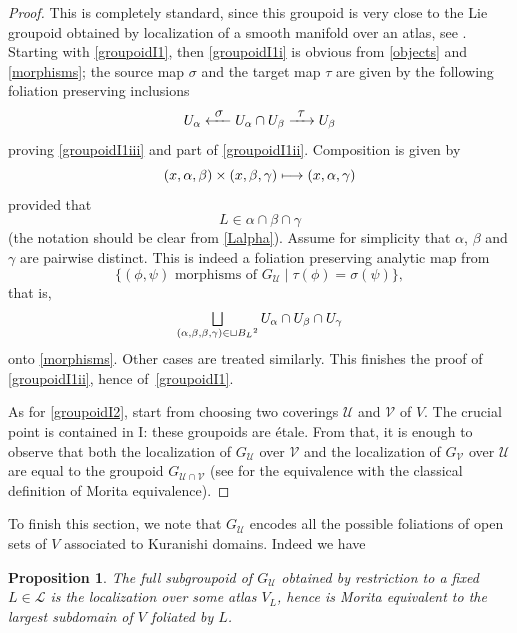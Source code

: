 \documentclass[JEP,XML,SOM,Unicode]{cedram}
\let\mathcal\mathscr
\let\oldbigsqcup\bigsqcup
\renewcommand{\bigsqcup}{\mathop{\textstyle\oldbigsqcup}\displaylimits}
\def\mto{\mathchoice{\longmapsto}{\mapsto}{\mapsto}{\mapsto}}
\def\To#1{\mathchoice{\xrightarrow{\textstyle\kern4pt#1\kern3pt}}{\stackrel{#1}{\longrightarrow}}{}{}}
\def\From#1{\mathchoice{\xleftarrow{\textstyle~#1~}}{\stackrel{#1}{\longleftarrow}}{}{}}
\theoremstyle{plain}
\newtheorem{proposition}[theorem]{Proposition}
\theoremstyle{definition}
\theoremstyle{remark}
\numberwithin{equation}{section}
\let\uniondisjointe\bigsqcup
\begin{document}
\begin{proof}
This is completely standard, since this groupoid is very close to the Lie groupoid obtained by localization of a smooth manifold over an atlas, see \cite[\S 7.1.3]{Ernesto}. Starting with \eqref{groupoidI1}, then \eqref{groupoidI1i} is obvious from \eqref{objects} and \eqref{morphisms}; the source map $\sigma$ and the target map $\tau$ are given by the following foliation preserving inclusions
\begin{equation}
\label{folinclusions}
U_{\alpha}\From{\sigma} U_{\alpha}\cap U_{\beta} \To{\tau}U_{\beta}
\end{equation}
proving \eqref{groupoidI1iii} and part of \eqref{groupoidI1ii}. Composition is given by
\begin{equation}
\label{composition}
(x,\alpha,\beta)\times (x,\beta,\gamma)\mto (x,\alpha,\gamma)
\end{equation}
provided that
\[
L\in\alpha\cap\beta\cap\gamma
\]
(the notation should be clear from \eqref{Lalpha}). Assume for simplicity that $\alpha$, $\beta$ and $\gamma$ are pairwise distinct.
This is indeed a foliation preserving analytic map from
\[
\{(\phi,\psi)\text{ morphisms of }G_{\mathcal U}\mid \tau (\phi)=\sigma (\psi)\},
\]
that is,
\begin{equation}
\label{compdomain}
\uniondisjointe_{(\alpha,\beta,\beta,\gamma)\in \sqcup {B_L}^2} U_{\alpha}\cap U_{\beta}\cap U_{\gamma}
\end{equation}
onto \eqref{morphisms}. Other cases are treated similarly. This finishes the proof of \eqref{groupoidI1ii}, hence of~\eqref{groupoidI1}.

As for \eqref{groupoidI2}, start from choosing two coverings $\mathcal U$ and $\mathcal V$ of $V$.
The crucial point is contained in I: these groupoids are étale. From that, it is enough to observe that both the localization of $G_{\mathcal U}$ over $\mathcal V$ and the localization of $G_{\mathcal V}$ over $\mathcal U$ are equal to the groupoid $G_{\mathcal U\cap \mathcal V}$ (see \cite{Ha} for the equivalence with the classical definition of Morita equivalence).
\end{proof}
To finish this section, we note that $G_{\mathcal U}$ encodes all the possible foliations of open sets of $V$ associated to Kuranishi domains. Indeed we have

\begin{proposition}
\label{full}
The full subgroupoid of $G_{\mathcal U}$ obtained by restriction to a fixed $L\in\mathcal L$ is the localization over some atlas $V_L$, hence is Morita equivalent to the largest subdomain of $V$ foliated by $L$.
\end{proposition}
\end{document}
